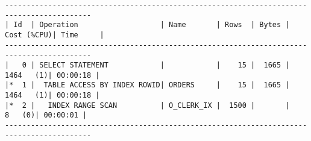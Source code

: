 \documentclass[11pt,a4paper,parskip=half]{scrartcl}
\begin{document}
\begin{lstlisting}
------------------------------------------------------------------------------------------                                                                                                                                                                                                                   
| Id  | Operation                   | Name       | Rows  | Bytes | Cost (%CPU)| Time     |                                                                                                                                                                                                                   
------------------------------------------------------------------------------------------                                                                                                                                                                                                                   
|   0 | SELECT STATEMENT            |            |    15 |  1665 |  1464   (1)| 00:00:18 |                                                                                                                                                                                                                   
|*  1 |  TABLE ACCESS BY INDEX ROWID| ORDERS     |    15 |  1665 |  1464   (1)| 00:00:18 |                                                                                                                                                                                                                   
|*  2 |   INDEX RANGE SCAN          | O_CLERK_IX |  1500 |       |     8   (0)| 00:00:01 |                                                                                                                                                                                                                   
------------------------------------------------------------------------------------------                                                                                                                                                                                                                   
                                                                                                                                                                                                                                                                                                             

\end{lstlisting}
\end{document}
